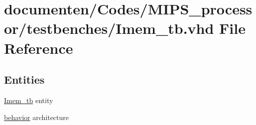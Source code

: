 \hypertarget{_imem__tb_8vhd}{\section{documenten/\-Codes/\-M\-I\-P\-S\-\_\-processor/testbenches/\-Imem\-\_\-tb.vhd File Reference}
\label{_imem__tb_8vhd}
}
\subsection*{Entities}
\begin{DoxyCompactItemize}
\item 
\hyperlink{class_imem__tb}{Imem\-\_\-tb} entity
\item 
\hyperlink{class_imem__tb_1_1behavior}{behavior} architecture
\end{DoxyCompactItemize}
